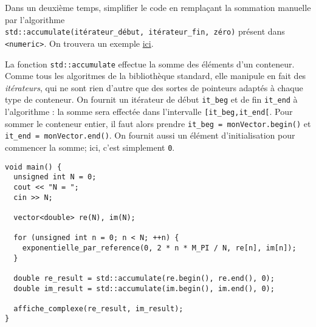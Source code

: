 \documentclass{book}
\newcommand{\inline}[1]{\texttt{#1}}
\begin{document}
\vspace{1em}
Dans un deuxième temps, simplifier le code en remplaçant la sommation manuelle par l'algorithme\\ \inline{std::accumulate(itérateur_début, itérateur_fin, zéro)} présent dans \inline{<numeric>}. On trouvera un exemple \href{https://en.cppreference.com/w/cpp/algorithm/accumulate}{ici}.

\begin{correction}
La fonction \inline{std::accumulate} effectue la somme des éléments d'un conteneur. Comme tous les algoritmes de la bibliothèque standard, elle manipule en fait des \emph{itérateurs}, qui ne sont rien d'autre que des sortes de pointeurs adaptés à chaque type de conteneur. On fournit un itérateur de début \texttt{it\_beg} et de fin \texttt{it\_end} à l'algorithme : la somme sera effectée dans l'intervalle \texttt{[it\_beg,it\_end[}. Pour sommer le conteneur entier, il faut alors prendre \inline{it_beg = monVector.begin()} et \inline{it_end = monVector.end()}. On fournit aussi un élément d'initialisation pour commencer la somme; ici, c'est simplement \inline{0}.

\begin{verbatim}
void main() {
  unsigned int N = 0;
  cout << "N = ";
  cin >> N;

  vector<double> re(N), im(N);

  for (unsigned int n = 0; n < N; ++n) {
    exponentielle_par_reference(0, 2 * n * M_PI / N, re[n], im[n]);
  }

  double re_result = std::accumulate(re.begin(), re.end(), 0);
  double im_result = std::accumulate(im.begin(), im.end(), 0);

  affiche_complexe(re_result, im_result);
}
\end{verbatim}
\end{correction}
\end{document}
